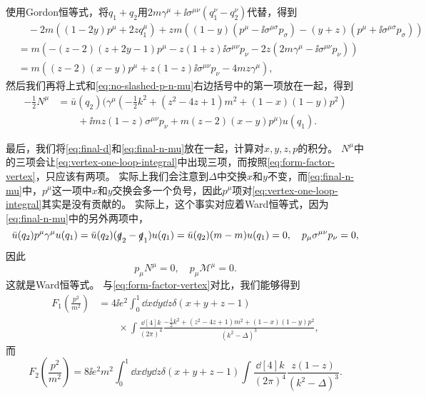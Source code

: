 使用Gordon恒等式，将$q_1 + q_2$用$2m \gamma^\mu + \ii \sigma^{\mu \nu}(q_1^\nu - q_2^\nu)$代替，得到
\[
    \begin{aligned}
        &\quad - 2m ((1-2y) p^\mu + 2z q_1^\mu) + zm((1-y) (p^\mu - \ii \sigma^{\mu \sigma} p_\sigma) - (y+z) (p^\mu + \ii \sigma^{\mu \sigma} p_\sigma)) \\
        &= m(- (z-2)(z+2y-1) p^\mu - z(1+z) \ii \sigma^{\mu \nu} p_\nu - 2z (2m \gamma^\mu - \ii \sigma^{\mu \nu} p_\nu)) \\
        &= m((z-2)(x-y) p^\mu + z(1 - z) \ii \sigma^{\mu \nu} p_\nu - 4mz \gamma^\mu ) ,
    \end{aligned}
\]
然后我们再将上式和\eqref{eq:no-slashed-p-n-mu}右边括号中的第一项放在一起，得到
\begin{equation}
    \begin{aligned}
        - \frac{1}{2} N^\mu &= \bar{u}(q_2) (\gamma^\mu (- \frac{1}{2} k^2 + (z^2 - 4z + 1) m^2 + (1-x)(1-y) p^2) \\
        &\quad \quad + \ii m z (1-z) \sigma^{\mu \nu} p_\nu + m (z-2) (x-y) p^\mu) u(q_1).
    \end{aligned}
    \label{eq:final-n-mu}
\end{equation}

最后，我们将\eqref{eq:final-d}和\eqref{eq:final-n-mu}放在一起，计算对$x, y, z, p$的积分。
$N^\mu$中的三项会让\eqref{eq:vertex-one-loop-integral}中出现三项，而按照\eqref{eq:form-factor-vertex}，只应该有两项。
实际上我们会注意到$\Delta$中交换$x$和$y$不变，而\eqref{eq:final-n-mu}中，$p^\mu$这一项中$x$和$y$交换会多一个负号，因此$p^\mu$项对\eqref{eq:vertex-one-loop-integral}其实是没有贡献的。
实际上，这个事实对应着Ward恒等式，因为\eqref{eq:final-n-mu}中的另外两项中，
\[
    \bar{u}(q_2) p^\mu \gamma^\mu u(q_1) = \bar{u}(q_2) (\slashed{q}_2 - \slashed{q}_1) u(q_1) = \bar{u}(q_2) (m - m)u(q_1) = 0, \quad p_\mu \sigma^{\mu \nu} p_\nu = 0,
\]
因此
\[
    p_\mu N^\mu = 0, \quad p_\mu \mathcal{M}^\mu = 0.
\]
这就是Ward恒等式。
与\eqref{eq:form-factor-vertex}对比，我们能够得到
\begin{equation}
    \begin{aligned}
        F_1\left(\frac{p^2}{m^2}\right) &= 4 \ii e^2 \int_0^1 \dd{x} \dd{y} \dd{z} \delta(x + y + z - 1) \\
        &\quad \quad \times \int \frac{\dd[4]{k}}{(2\pi)^4} \frac{- \frac{1}{2} k^2 + (z^2 - 4z + 1) m^2 + (1-x) (1-y) p^2}{(k^2 - \Delta)^3},
    \end{aligned}
    \label{eq:f1-in-4d}
\end{equation}
而
\begin{equation}
    F_2\left(\frac{p^2}{m^2}\right) = 8 \ii e^2 m^2 \int_0^1 \dd{x} \dd{y} \dd{z} \delta(x + y + z - 1) \int \frac{\dd[4]{k}}{(2\pi)^4} \frac{z(1-z)}{(k^2 - \Delta)^3}.
\end{equation}

